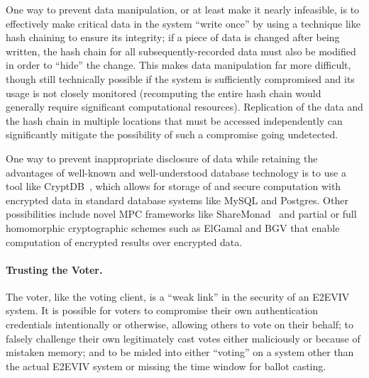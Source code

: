 One way to prevent data manipulation, or at least make it nearly
infeasible, is to effectively make critical data in the system ``write
once'' by using a technique like hash chaining to ensure its
integrity; if a piece of data is changed after being written, the hash
chain for all subsequently-recorded data must also be modified in
order to ``hide'' the change. This makes data manipulation far more
difficult, though still technically possible if the system is
sufficiently compromised and its usage is not closely monitored
(recomputing the entire hash chain would generally require significant
computational resources). Replication of the data and the hash chain
in multiple locations that must be accessed independently can
significantly mitigate the possibility of such a compromise going
undetected.

One way to prevent inappropriate disclosure of data while retaining
the advantages of well-known and well-understood database technology
is to use a tool like CryptDB~\cite{Popa11}, which allows for storage
of and secure computation with encrypted data in standard database
systems like MySQL and Postgres. Other possibilities include novel MPC
frameworks like ShareMonad~\cite{Launchbury14} and partial or full
homomorphic cryptographic schemes such as ElGamal and BGV that enable
computation of encrypted results over encrypted data.

\paragraph{Trusting the Voter.} The voter, like the voting client, is
a ``weak link'' in the security of an E2EVIV system. It is possible
for voters to compromise their own authentication credentials
intentionally or otherwise, allowing others to vote on their behalf;
to falsely challenge their own legitimately cast votes either
maliciously or because of mistaken memory; and to be misled into
either ``voting'' on a system other than the actual E2EVIV system or
missing the time window for ballot casting.

